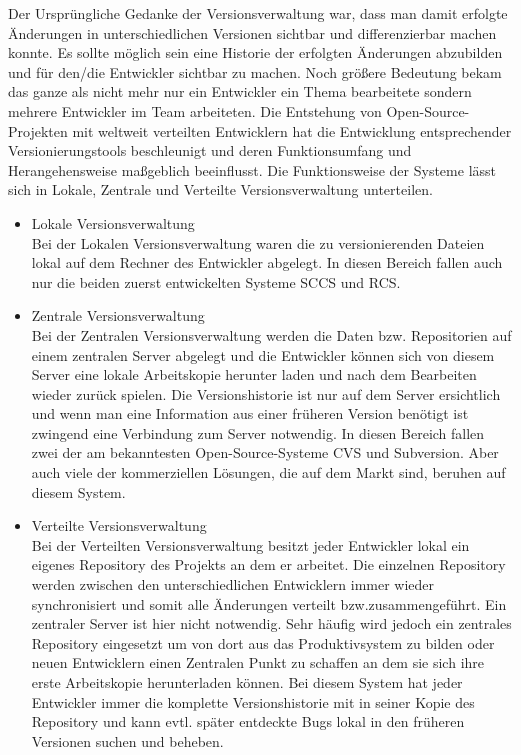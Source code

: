 Der Ursprüngliche Gedanke der Versionsverwaltung war, dass man damit erfolgte Änderungen in unterschiedlichen Versionen sichtbar und differenzierbar machen konnte. Es sollte möglich sein eine Historie der erfolgten Änderungen abzubilden und für den/die Entwickler sichtbar zu machen. Noch größere Bedeutung bekam das ganze als nicht mehr nur ein Entwickler ein Thema bearbeitete sondern mehrere Entwickler im Team arbeiteten. Die Entstehung von Open-Source-Projekten mit weltweit verteilten Entwicklern hat die Entwicklung entsprechender Versionierungstools beschleunigt und deren Funktionsumfang und Herangehensweise maßgeblich beeinflusst.
Die Funktionsweise der Systeme lässt sich in Lokale, Zentrale und Verteilte Versionsverwaltung unterteilen. 
\begin{itemize}
\item{Lokale Versionsverwaltung}\\
Bei der Lokalen Versionsverwaltung waren die zu versionierenden Dateien lokal auf dem Rechner des Entwickler abgelegt. In diesen Bereich fallen auch nur die beiden zuerst entwickelten Systeme SCCS und RCS. 


\item{Zentrale Versionsverwaltung}\\
Bei der Zentralen Versionsverwaltung werden die Daten bzw. Repositorien auf einem zentralen Server abgelegt und die Entwickler können sich von diesem Server eine lokale Arbeitskopie herunter laden und nach dem Bearbeiten wieder zurück spielen. Die Versionshistorie ist nur auf dem Server ersichtlich und wenn man eine Information aus einer früheren Version benötigt ist zwingend eine Verbindung zum Server notwendig. In diesen Bereich fallen zwei der am bekanntesten Open-Source-Systeme CVS und Subversion. Aber auch viele der kommerziellen Lösungen, die auf dem Markt sind, beruhen auf diesem System.



\item{Verteilte Versionsverwaltung}\\
Bei der Verteilten Versionsverwaltung besitzt jeder Entwickler lokal ein eigenes Repository des Projekts an dem er arbeitet. Die einzelnen Repository werden zwischen den unterschiedlichen Entwicklern immer wieder synchronisiert und somit alle Änderungen verteilt bzw.\@	 zusammengeführt. Ein zentraler Server ist hier nicht notwendig. Sehr häufig wird jedoch ein zentrales Repository eingesetzt um von dort aus das Produktivsystem zu bilden oder neuen Entwicklern einen Zentralen Punkt zu schaffen an dem sie sich ihre erste Arbeitskopie herunterladen können. Bei diesem System hat jeder Entwickler immer die komplette Versionshistorie mit in seiner Kopie des Repository und kann evtl. später entdeckte Bugs lokal in den früheren Versionen suchen und beheben.
\end{itemize}

